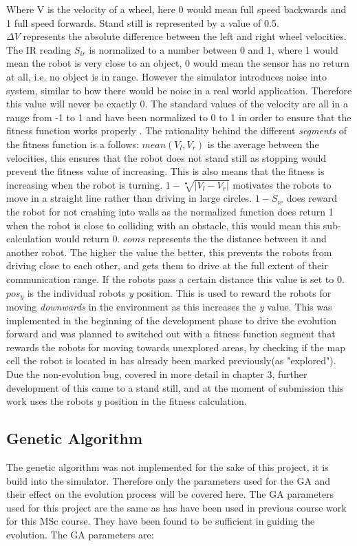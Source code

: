 Where V is the velocity of a wheel, here 0 would mean full speed backwards and 1 full speed forwards. Stand still is represented by a value of 0.5.\\
$\Delta V$ represents the absolute difference between the left and right wheel velocities. 
The IR reading $S_{ir}$ is normalized to a number between 0 and 1, where 1 would mean the robot is very close to an object, 0 would mean the sensor has no return at all, i.e. no object is in range. However the simulator introduces noise into system, similar to how there would be noise in a real world application. Therefore this value will never be exactly 0. 
The standard values of the velocity are all in a range from -1 to 1 and have been normalized to 0 to 1 in order to ensure that the fitness function works properly \cite{499791}.  
The rationality behind the different \textit{segments} of the fitness function is a follows: 
$mean(V_l, V_r)$ is the average between the velocities, this ensures that the robot does not stand still as stopping would prevent the fitness value of increasing. This is also means that the fitness is increasing when the robot is turning. 
$1 - \sqrt[•]{|V_l - V_r|}$ motivates the robots to move in a straight line rather than driving in large circles. 
$1 - S_{ir}$ does reward the robot for not crashing into walls as the normalized function does return 1 when the robot is close to colliding with an obstacle, this would mean this sub-calculation would return 0. 
$coms$ represents the the distance between it and another robot. The higher the value the better, this prevents the robots from driving close to each other, and gets them to drive at the full extent of their communication range. If the robots pass a certain distance this value is set to 0.
$pos_y$ is the individual robots \textit{y} position. This is used to reward the robots for moving \textit{downwards} in the environment as this increases the \textit{y} value. 
This was implemented in the beginning of the development phase to drive the evolution forward and was planned to switched out with a fitness function segment that rewards the robots for moving towards unexplored areas, by checking if the map cell the robot is located in has already been marked previously(as "explored").
Due the non-evolution bug, covered in more detail in chapter 3, further development of this came to a stand still, and at the moment of submission this work uses the robots \textit{y} position in the fitness calculation.

\subsection{Genetic Algorithm}
The genetic algorithm was not implemented for the sake of this project, it is build into the simulator. Therefore only the parameters used for the GA and their effect on the evolution process will be covered here.  
The GA parameters used for this project are the same as has have been used in previous course work for this MSc course. They have been found to be sufficient in guiding the evolution. The GA parameters are:\\

